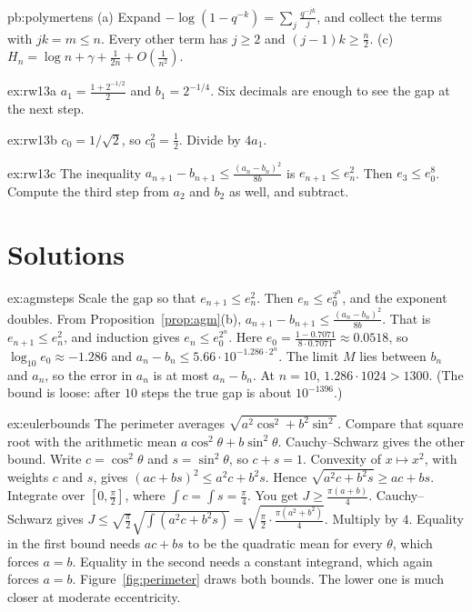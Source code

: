 \begin{hint}{pb:polymertens}
(a) Expand $-\log(1-q^{-k})=\sum_j\frac{q^{-jk}}j$, and collect the terms with $jk=m\le n$. Every other term has $j\ge2$ and $(j-1)k\ge\frac n2$. (c) $H_n=\log n+\gamma+\frac1{2n}+O(\frac1{n^2})$.
\end{hint}

\begin{hint}{ex:rw13a}
$a_1=\frac{1+2^{-1/2}}2$ and $b_1=2^{-1/4}$. Six decimals are enough to see the gap at the next step.
\end{hint}

\begin{hint}{ex:rw13b}
$c_0=1/\sqrt2$, so $c_0^2=\frac12$. Divide by $4a_1$.
\end{hint}

\begin{hint}{ex:rw13c}
The inequality $a_{n+1}-b_{n+1}\le\frac{(a_n-b_n)^2}{8b}$ is $e_{n+1}\le e_n^2$. Then $e_3\le e_0^8$. Compute the third step from $a_2$ and $b_2$ as well, and subtract.
\end{hint}

\section{Solutions}

\begin{solution}{ex:agmsteps}
\idea Scale the gap so that $e_{n+1}\le e_n^2$. Then $e_n\le e_0^{2^n}$, and the exponent doubles.
\writeup From Proposition~\ref{prop:agm}(b), $a_{n+1}-b_{n+1}\le\frac{(a_n-b_n)^2}{8b}$. That is $e_{n+1}\le e_n^2$, and induction gives $e_n\le e_0^{2^n}$. Here
$e_0=\frac{1-0.7071}{8\cdot0.7071}\approx0.0518$, so $\log_{10}e_0\approx-1.286$ and $a_n-b_n\le5.66\cdot10^{-1.286\cdot2^n}$. The limit $M$ lies between $b_n$ and $a_n$, so the error in $a_n$
is at most $a_n-b_n$. At $n=10$, $1.286\cdot1024>1300$. (The bound is loose: after $10$ steps the true gap is about $10^{-1396}$.)
\end{solution}

\begin{solution}{ex:eulerbounds}
\idea The perimeter averages $\sqrt{a^2\cos^2+b^2\sin^2}$. Compare that square root with the arithmetic mean $a\cos^2\theta+b\sin^2\theta$. Cauchy--Schwarz gives the other bound.
\writeup Write $c=\cos^2\theta$ and $s=\sin^2\theta$, so $c+s=1$. Convexity of $x\mapsto x^2$, with weights $c$ and $s$, gives $(ac+bs)^2\le a^2c+b^2s$. Hence
$\sqrt{a^2c+b^2s}\ge ac+bs$. Integrate over $[0,\frac\pi2]$, where $\int c=\int s=\frac\pi4$. You get $J\ge\frac{\pi(a+b)}4$. Cauchy--Schwarz gives
$J\le\sqrt{\frac\pi2}\sqrt{\int(a^2c+b^2s)}=\sqrt{\frac\pi2\cdot\frac{\pi(a^2+b^2)}4}$. Multiply by $4$. Equality in the first bound needs $ac+bs$ to be the quadratic mean for every
$\theta$, which forces $a=b$. Equality in the second needs a constant integrand, which again forces $a=b$. Figure~\ref{fig:perimeter} draws both bounds. The lower one is
much closer at moderate eccentricity.
\end{solution}

